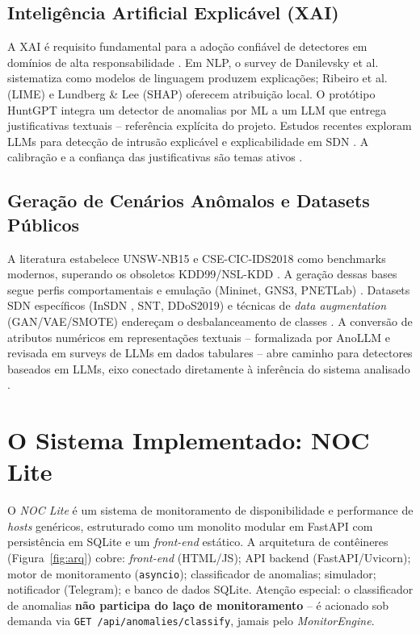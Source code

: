 \documentclass[12pt,a4paper]{article}
\begin{document}
\subsection{Inteligência Artificial Explicável (XAI)}
\label{sec:xai}

A XAI é requisito fundamental para a adoção confiável de detectores em domínios
de alta responsabilidade \cite{rA52}\cite{rA531}\cite{rA517}. Em NLP, o survey de Danilevsky et
al. \cite{rA51} sistematiza como modelos de linguagem produzem explicações; Ribeiro
et al. \cite{rA53} (LIME) e Lundberg \& Lee \cite{rA54} (SHAP) oferecem atribuição local.
O protótipo HuntGPT \cite{rA511} integra um detector de anomalias por ML a um LLM
que entrega justificativas textuais -- referência explícita do projeto. Estudos
recentes exploram LLMs para detecção de intrusão explicável \cite{rA520}\cite{rA521} e
explicabilidade em SDN \cite{rA522}. A calibração e a confiança das justificativas
são temas ativos \cite{rA531}\cite{rA532}\cite{rA533}\cite{rA534}.

\subsection{Geração de Cenários Anômalos e Datasets Públicos}
\label{sec:datasets}

A literatura estabelece UNSW-NB15 \cite{rA61}\cite{rA62} e CSE-CIC-IDS2018 \cite{rA63}\cite{rA64} como
benchmarks modernos, superando os obsoletos KDD99/NSL-KDD \cite{rA65}\cite{rA66}. A
geração dessas bases segue perfis comportamentais e emulação (Mininet,
GNS3, PNETLab) \cite{rA69}\cite{rA629}. Datasets SDN específicos (InSDN
\cite{rA610}, SNT, DDoS2019) e técnicas de \textit{data augmentation} (GAN/VAE/SMOTE)
endereçam o desbalanceamento de classes \cite{rA614}\cite{rA615}\cite{rA623}. A conversão de
atributos numéricos em representações textuais -- formalizada por AnoLLM
\cite{rA616} e revisada em surveys de LLMs em dados tabulares \cite{rA617}\cite{rA618} -- abre
caminho para detectores baseados em LLMs, eixo conectado diretamente à
inferência do sistema analisado \cite{rA630}.

\section{O Sistema Implementado: NOC Lite}
\label{sec:sistema}

O \textit{NOC Lite} é um sistema de monitoramento de disponibilidade e
performance de \textit{hosts} genéricos, estruturado como um monolito modular em
FastAPI com persistência em SQLite e um \textit{front-end} estático. A
arquitetura de contêineres (Figura~\ref{fig:arq}) cobre: \textit{front-end}
(HTML/JS); API backend (FastAPI/Uvicorn); motor de monitoramento
(\texttt{asyncio}); classificador de anomalias; simulador; notificador
(Telegram); e banco de dados SQLite. Atenção especial: o classificador de
anomalias \textbf{não participa do laço de monitoramento} -- é acionado sob
demanda via \texttt{GET /api/anomalies/classify}, jamais pelo
\textit{MonitorEngine}.
\end{document}

